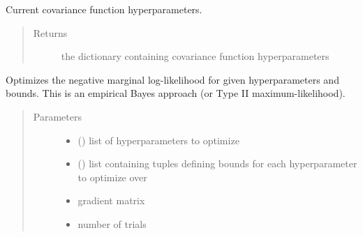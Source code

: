 \documentclass[letterpaper,10pt,english]{sphinxmanual}
\begin{document}
\begin{fulllineitems}
\begin{fulllineitems}
\label{\detokenize{index:bo.surrogates.gaussian_process.GaussianProcess.get_cov_params}}
Current covariance function hyperparameters.
\begin{quote}\begin{description}
\item[{Returns}] \leavevmode
the dictionary containing covariance function hyperparameters

\end{description}\end{quote}

\end{fulllineitems}


\begin{fulllineitems}
\label{\detokenize{index:bo.surrogates.gaussian_process.GaussianProcess.opt_hyp}}
Optimizes the negative marginal log-likelihood for given hyperparameters and bounds.
This is an empirical Bayes approach (or Type II maximum-likelihood).
\begin{quote}\begin{description}
\item[{Parameters}] \leavevmode\begin{itemize}
\item {} 
 () \textendash{} list of hyperparameters to optimize

\item {} 
 () \textendash{} list containing tuples defining bounds for each hyperparameter to optimize over

\item {} 
 \textendash{} gradient matrix

\item {} 
 \textendash{} number of trials

\end{itemize}


\end{description}
\end{quote}
\end{fulllineitems}
\end{fulllineitems}
\end{document}
